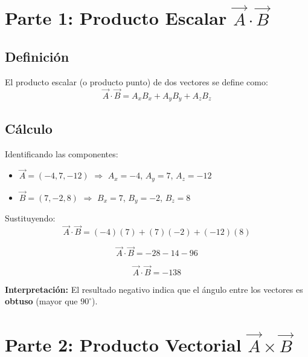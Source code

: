 \documentclass[12pt,letterpaper]{article}
\begin{document}
\section*{Parte 1: Producto Escalar $\vec{A} \cdot \vec{B}$}

\subsection*{Definici\'on}

El producto escalar (o producto punto) de dos vectores se define como:
\begin{equation*}
\vec{A} \cdot \vec{B} = A_x B_x + A_y B_y + A_z B_z
\end{equation*}

\subsection*{C\'alculo}

Identificando las componentes:
\begin{itemize}
    \item $\vec{A} = (-4, 7, -12)$ \quad $\Rightarrow$ \quad $A_x = -4$, $A_y = 7$, $A_z = -12$
    \item $\vec{B} = (7, -2, 8)$ \quad $\Rightarrow$ \quad $B_x = 7$, $B_y = -2$, $B_z = 8$
\end{itemize}

Sustituyendo:
\begin{equation*}
\vec{A} \cdot \vec{B} = (-4)(7) + (7)(-2) + (-12)(8)
\end{equation*}

\begin{equation*}
\vec{A} \cdot \vec{B} = -28 - 14 - 96
\end{equation*}

\begin{equation*}
\boxed{\vec{A} \cdot \vec{B} = -138}
\end{equation*}

\textbf{Interpretaci\'on:} El resultado negativo indica que el \'angulo entre los vectores es \textbf{obtuso} (mayor que $90^\circ$).

\section*{Parte 2: Producto Vectorial $\vec{A} \times \vec{B}$}
\end{document}
